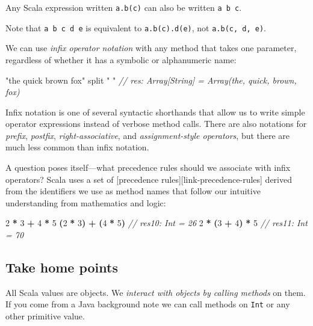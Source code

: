 \documentclass[11pt,a5paper,]{book}
\newenvironment{Shaded}{\begin{snugshade}}{\end{snugshade}}
\newcommand{\CommentTok}[1]{\textcolor[rgb]{0.56,0.35,0.01}{\textit{#1}}}
\newcommand{\DecValTok}[1]{\textcolor[rgb]{0.00,0.00,0.81}{#1}}
\newcommand{\NormalTok}[1]{#1}
\newcommand{\OperatorTok}[1]{\textcolor[rgb]{0.81,0.36,0.00}{\textbf{#1}}}
\newcommand{\StringTok}[1]{\textcolor[rgb]{0.31,0.60,0.02}{#1}}
\begin{document}
Any Scala expression written \texttt{a.b(c)} can also be written
\texttt{a\ b\ c}.

Note that \texttt{a\ b\ c\ d\ e} is equivalent to \texttt{a.b(c).d(e)},
not \texttt{a.b(c,\ d,\ e)}.

We can use \emph{infix operator notation} with any method that takes one
parameter, regardless of whether it has a symbolic or alphanumeric name:

\begin{Shaded}
\begin{Highlighting}[]
\StringTok{"the quick brown fox"}\NormalTok{ split }\StringTok{" "}
\CommentTok{// res: Array[String] = Array(the, quick, brown, fox)}
\end{Highlighting}
\end{Shaded}

Infix notation is one of several syntactic shorthands that allow us to
write simple operator expressions instead of verbose method calls. There
are also notations for \emph{prefix}, \emph{postfix},
\emph{right-associative}, and \emph{assignment-style operators}, but
there are much less common than infix notation.

A question poses itself---what precedence rules should we associate with
infix operators? Scala uses a set of {[}precedence
rules{]}{[}link-precedence-rules{]} derived from the identifiers we use
as method names that follow our intuitive understanding from mathematics
and logic:

\begin{Shaded}
\begin{Highlighting}[]
\DecValTok{2} \OperatorTok{*} \DecValTok{3} \OperatorTok{+} \DecValTok{4} \OperatorTok{*} \DecValTok{5}
\OperatorTok{(}\DecValTok{2} \OperatorTok{*} \DecValTok{3}\OperatorTok{)} \OperatorTok{+} \OperatorTok{(}\DecValTok{4} \OperatorTok{*} \DecValTok{5}\OperatorTok{)}
\CommentTok{// res10: Int = 26}
\DecValTok{2} \OperatorTok{*} \OperatorTok{(}\DecValTok{3} \OperatorTok{+} \DecValTok{4}\OperatorTok{)} \OperatorTok{*} \DecValTok{5}
\CommentTok{// res11: Int = 70}
\end{Highlighting}
\end{Shaded}

\hypertarget{take-home-points-1}{%
\subsection{Take home points}\label{take-home-points-1}}

All Scala values are objects. We \emph{interact with objects by calling
methods} on them. If you come from a Java background note we can call
methods on \texttt{Int} or any other primitive value.
\end{document}
